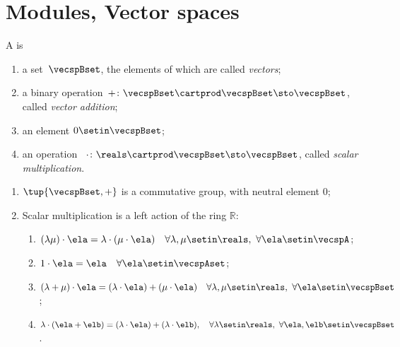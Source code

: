 
\section{Modules, Vector spaces}
\label{sec:vector-spaces}

\begin{ctdefinition}
    \label{def:real-vector-space}
    A  is
    \begin{body}
        \constit
        \begin{enumerate}
            \item a set~$\vecspBset$, the elements of which are called \emph{vectors};
            \item a binary operation~$+ \colon \vecspBset \cartprod \vecspBset \sto \vecspBset$, called \emph{vector addition};
            \item an element $0 \setin \vecspBset$;
            \item an operation ~$\cdot \colon \reals \cartprod \vecspBset \sto \vecspBset$, called \emph{scalar multiplication}.
        \end{enumerate}
        \condit
        \begin{enumerate}
            \item $\tup{\vecspBset, +}$ is a commutative group, with neutral element $0$;
            \item Scalar multiplication is a left action of the ring $\mathbb{R}$:
                  \begin{enumerate}
                      \item $(\lambda \mu) \cdot \ela = \lambda \cdot( \mu \cdot \ela) \quad \forall \lambda, \mu \setin \reals, \ \forall \ela \setin \vecspA$;
                      \item $1 \cdot \ela = \ela \quad \forall \ela \setin \vecspAset$;
                      \item $(\lambda + \mu) \cdot \ela = (\lambda \cdot \ela) + (\mu \cdot \ela) \quad \forall \lambda, \mu \setin \reals, \ \forall \ela \setin \vecspBset$;
                      \item $\lambda \cdot (\ela + \elb) = (\lambda \cdot \ela) + (\lambda \cdot \elb), \quad \forall \lambda \setin \reals, \ \forall \ela, \elb \setin \vecspBset$.
                  \end{enumerate}
        \end{enumerate}
    \end{body}
\end{ctdefinition}


